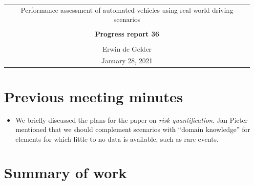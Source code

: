 \documentclass[10pt,final,a4paper,oneside,onecolumn]{article}
\newcommand{\progressreportnumber}{36}
\renewcommand{\author}{Erwin de Gelder}
\renewcommand{\date}{January 28, 2021}
\renewcommand{\title}{Performance assessment of automated vehicles using real-world driving scenarios}
\begin{document}
	
\begin{center}
	\begin{tabular}{c}
		\title \\ \\
		\textbf{\huge Progress report \progressreportnumber} \\ \\
		\author \\ 
		\date
	\end{tabular}
\end{center}

\section{Previous meeting minutes}

\begin{itemize}
	\item We briefly discussed the plans for the paper on \emph{risk quantification}. Jan-Pieter mentioned that we should complement scenarios with ``domain knowledge'' for elements for which little to no data is available, such as rare events.
\end{itemize}

\section{Summary of work}
\end{document}
